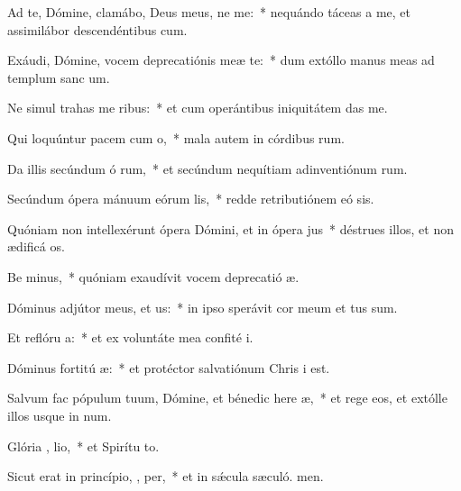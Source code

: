 \item Ad te, Dómine, clamábo, Deus meus, ne   me:~* nequándo táceas a me, et assimilábor descendéntibus  cum.
\item Exáudi, Dómine, vocem deprecatiónis meæ    te:~* dum extóllo manus meas ad templum sanc um.
\item Ne simul trahas me  ribus:~* et cum operántibus iniquitátem  das me.
\item Qui loquúntur pacem cum  o,~* mala autem in córdibus rum.
\item Da illis secúndum ó rum,~* et secúndum nequítiam adinventiónum rum.
\item Secúndum ópera mánuum eórum  lis,~* redde retributiónem eó sis.
\item Quóniam non intellexérunt ópera Dómini, et in ópera  jus~* déstrues illos, et non ædificá os.
\item Be minus,~* quóniam exaudívit vocem deprecatió æ.
\item Dóminus adjútor meus, et  us:~* in ipso sperávit cor meum et tus sum.
\item Et reflóru  a:~* et ex voluntáte mea confité i.
\item Dóminus fortitú  æ:~* et protéctor salvatiónum Chris i est.
\item Salvum fac pópulum tuum, Dómine, et bénedic here æ,~* et rege eos, et extólle illos usque in num.
\item Glória ,  lio,~* et Spirítu to.
\item Sicut erat in princípio,  ,  per,~* et in sǽcula sæculó. men.
